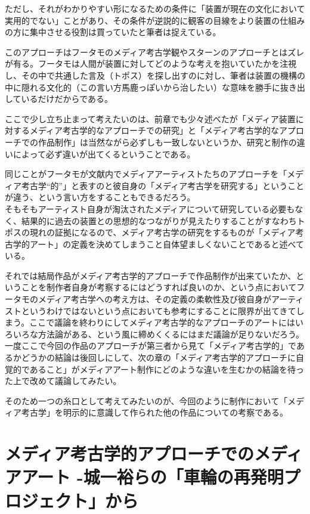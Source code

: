 \documentclass[a4paper,report]{jsbook}
\begin{document}
ただし、それがわかりやすい形になるための条件に「装置が現在の文化において実用的でない」ことがあり、その条件が逆説的に観客の目線をより装置の仕組みの方に集中させる役割は買っていたと筆者は捉えている。

このアプローチはフータモのメディア考古学観やスターンのアプローチとはズレが有る。フータモは人間が装置に対してどのような考えを抱いていたかを注視し、その中で共通した言及（トポス）を探し出すのに対し、筆者は装置の機構の中に隠れる文化的（この言い方馬鹿っぽいから治したい）な意味を勝手に抜き出しているだけだからである。

ここで少し立ち止まって考えたいのは、前章でも少々述べたが「メディア装置に対するメディア考古学的なアプローチでの研究」と「メディア考古学的なアプローチでの作品制作」は当然ながら必ずしも一致しないというか、研究と制作の違いによって必ず違いが出てくるということである。

同じことがフータモが文献内でメディアアーティストたちのアプローチを「メディア考古学``的''」と表すのと彼自身の「メディア考古学を研究する」ということが違う、という言い方をすることもできるだろう。\\
そもそもアーティスト自身が淘汰されたメディアについて研究している必要もなく、結果的に過去の装置との思想的なつながりが見えたりすることがすなわちトポスの現れの証拠になるので、メディア考古学の研究をするものが「メディア考古学的アート」の定義を決めてしまうこと自体望ましくないことであると述べている。

それでは結局作品がメディア考古学的アプローチで作品制作が出来ていたか、ということを制作者自身が考察するにはどうすれば良いのか、という点においてフータモのメディア考古学への考え方は、その定義の柔軟性及び彼自身がアーティストというわけではないという点においても参考にすることに限界が出てきてしまう。ここで議論を終わりにしてメディア考古学的なアプローチのアートにはいろいろな方法論がある、という風に締めくくるにはまだ議論が足りないだろう。\\
一度ここで今回の作品のアプローチが第三者から見て「メディア考古学的」であるかどうかの結論は後回しにして、次の章の「メディア考古学的アプローチに自覚的であること」がメディアアート制作にどのような違いを生むかの結論を待った上で改めて議論してみたい。

そのため一つの糸口として考えてみたいのが、今回のように制作において「メディア考古学」を明示的に意識して作られた他の作品についての考察である。

\section{メディア考古学的アプローチでのメディアアート
-城一裕らの「車輪の再発明プロジェクト」から}\label{ux30e1ux30c7ux30a3ux30a2ux8003ux53e4ux5b66ux7684ux30a2ux30d7ux30edux30fcux30c1ux3067ux306eux30e1ux30c7ux30a3ux30a2ux30a2ux30fcux30c8--ux57ceux4e00ux88d5ux3089ux306eux8ecaux8f2aux306eux518dux767aux660eux30d7ux30edux30b8ux30a7ux30afux30c8ux304bux3089}
\end{document}
